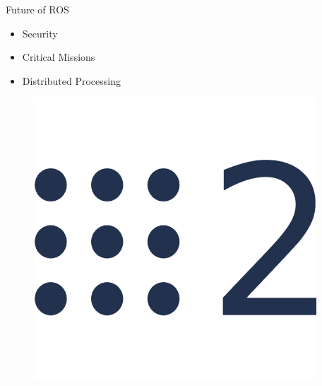 \documentclass{beamer}
\begin{document}
\begin{frame}{Future of ROS}

\begin{itemize}
\item Security
\item Critical Missions
\item Distributed Processing
\end{itemize}

\begin{figure}
\includegraphics[scale=0.2]{figs/img/ros2}
\end{figure}  

\end{frame}




\end{document}
